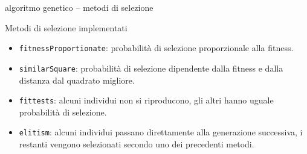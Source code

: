 \documentclass[10pt]{beamer}
\begin{document}
\begin{frame}{algoritmo genetico -- metodi di selezione}
	\begin{block}{Metodi di selezione implementati}
	\parbox{0.98\columnwidth}{
	\begin{itemize}
		\item \texttt{fitnessProportionate}: probabilità di selezione proporzionale alla fitness.
		\item \texttt{similarSquare}: probabilità di selezione dipendente dalla fitness e dalla distanza dal quadrato migliore.
		\item \texttt{fittests}: alcuni individui non si riproducono, gli altri hanno uguale probabilità di selezione.
		\item \texttt{elitism}: alcuni individui passano direttamente alla generazione successiva, i restanti vengono selezionati secondo uno dei precedenti metodi.
	\end{itemize}
	}
	\end{block}
\end{frame}
\end{document}
